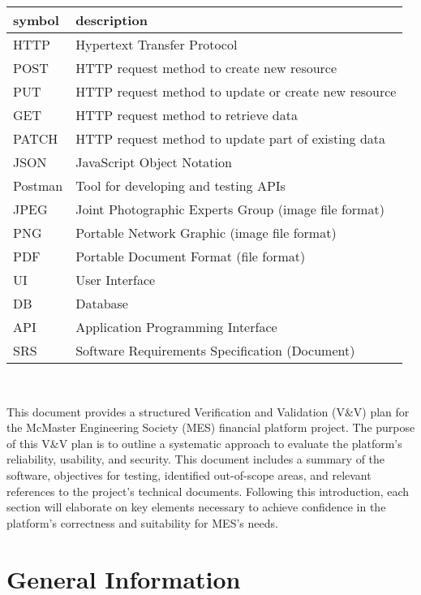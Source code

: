 \documentclass[12pt, titlepage]{article}
\begin{document}
\renewcommand{\arraystretch}{1.2}
\begin{tabular}{l l} 
  \toprule		
  \textbf{symbol} & \textbf{description}\\
  \midrule 
  HTTP & Hypertext Transfer Protocol\\
  POST & HTTP request method to create new resource\\
  PUT & HTTP request method to update or create new resource\\
  GET & HTTP request method to retrieve data\\
  PATCH & HTTP request method to update part of existing data\\
  JSON & JavaScript Object Notation\\
  Postman & Tool for developing and testing APIs\\
  JPEG & Joint Photographic Experts Group (image file format)\\
  PNG & Portable Network Graphic (image file format)\\
  PDF & Portable Document Format (file format)\\
  UI & User Interface\\
  DB & Database\\
  API & Application Programming Interface\\
  SRS & Software Requirements Specification (Document)\\
  \bottomrule
\end{tabular}\\



\newpage


This document provides a structured Verification and Validation (V\&V) plan for the McMaster Engineering Society (MES) financial platform project. The purpose of this V\&V plan is to outline a systematic approach to evaluate the platform's reliability, usability, and security. This document includes a summary of the software, objectives for testing, identified out-of-scope areas, and relevant references to the project's technical documents. Following this introduction, each section will elaborate on key elements necessary to achieve confidence in the platform's correctness and suitability for MES’s needs.

\section{General Information}
\end{document}
